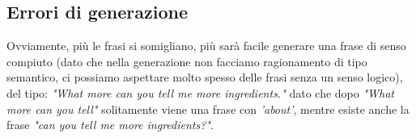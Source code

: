 \subsection{Errori di generazione}
Ovviamente, più le frasi si somigliano, più sarà facile generare una frase di senso compiuto (dato che nella generazione non facciamo ragionamento di tipo semantico, ci possiamo aspettare molto spesso delle frasi senza un senso logico), del tipo: \textit{"What more can you tell me more ingredients."} dato che dopo \textit{"What more can you tell"} solitamente viene una frase con \textit{'about'}, mentre esiste anche la frase \textit{"can you tell me more ingredients?"}.